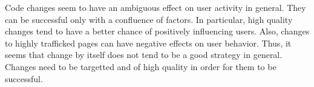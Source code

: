 \documentclass[10pt]{article}
\begin{document}
Code changes seem to have an ambiguous effect on user activity in general. They can be successful only with a confluence of factors. In particular, high quality changes tend to have a better chance of positively influencing users. Also, changes to highly trafficked pages can have negative effects on user behavior. Thus, it seems that change by itself does not tend to be a good strategy in general. Changes need to be targetted and of high quality in order for them to be successful. 
\end{document}
